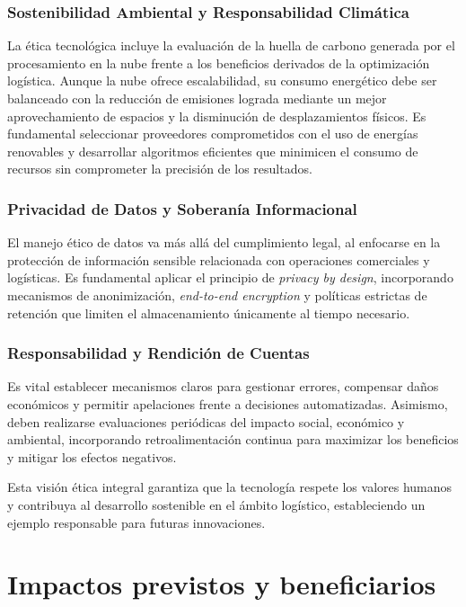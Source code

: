 \subsubsection{Sostenibilidad Ambiental y Responsabilidad Climática}
La ética tecnológica incluye la evaluación de la huella de carbono generada por el procesamiento en la nube frente a los beneficios derivados de la optimización logística. Aunque la nube ofrece escalabilidad, su consumo energético debe ser balanceado con la reducción de emisiones lograda mediante un mejor aprovechamiento de espacios y la disminución de desplazamientos físicos. Es fundamental seleccionar proveedores comprometidos con el uso de energías renovables y desarrollar algoritmos eficientes que minimicen el consumo de recursos sin comprometer la precisión de los resultados.
\subsubsection{Privacidad de Datos y Soberanía Informacional}
El manejo ético de datos va más allá del cumplimiento legal, al enfocarse en la protección de información sensible relacionada con operaciones comerciales y logísticas. Es fundamental aplicar el principio de \textit{privacy by design}, incorporando mecanismos de anonimización, \textit{end-to-end encryption} y políticas estrictas de retención que limiten el almacenamiento únicamente al tiempo necesario.
\subsubsection{Responsabilidad y Rendición de Cuentas}
Es vital establecer mecanismos claros para gestionar errores, compensar daños económicos y permitir apelaciones frente a decisiones automatizadas. Asimismo, deben realizarse evaluaciones periódicas del impacto social, económico y ambiental, incorporando retroalimentación continua para maximizar los beneficios y mitigar los efectos negativos.

Esta visión ética integral garantiza que la tecnología respete los valores humanos y contribuya al desarrollo sostenible en el ámbito logístico, estableciendo un ejemplo responsable para futuras innovaciones.


\section{Impactos previstos y beneficiarios}


